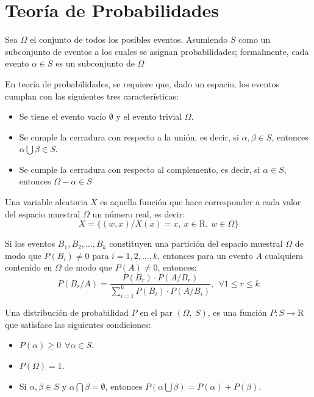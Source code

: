\section{Teoría de Probabilidades}
\label{sec:teoria-probabilidades}
  \begin{defn} Sea $\Omega$ el conjunto de todos los 
  posibles eventos. Asumiendo $S$ como un subconjunto de eventos a los cuales 
  se asignan probabilidades; formalmente, cada evento $\alpha \in S$ es un 
  subconjunto de $\Omega$
  \end{defn}
 En teoría de probabilidades, se requiere que, dado un espacio, los eventos 
 cumplan con las siguientes tres características:
  \begin{itemize}
    \item Se tiene el evento vacío $\emptyset$ y el evento trivial $\Omega$.
    \item Se cumple la cerradura con respecto a la unión, es decir, si 
    $\alpha, \beta \in S$, entonces $\alpha \bigcup \beta \in S$.
    \item Se cumple la cerradura con respecto al complemento, es decir, si 
    $\alpha \in S$, entonces $\Omega - \alpha \in S$
  \end{itemize}
  \begin{defn} Una variable aleatoria $X$ es aquella 
  función que hace corresponder a cada valor del espacio muestral $\Omega$ un 
  número real, es decir: 
  $$X = \lbrace (w, x) / X(x) = x, ~x \in \mathrm{R}, ~w \in \Omega \rbrace$$
	\end{defn}
  \begin{thm} Si los eventos $B_1, B_2, \dots, B_k$ 
  constituyen una partición del espacio muestral $\Omega$ de modo que 
  $P(B_i) \neq 0$ para $i = 1,2,\dots,k$, entonces para un evento $A$ 
  cualquiera contenido en $\Omega$ de modo que $P(A) \neq 0$, entonces: 
  $$P(B_r / A) = \dfrac{P(B_r) \cdot P(A / B_r)}{\displaystyle\sum_{i=1}^{k}{P(B_i) \cdot P(A / B_i)}}, ~~ \forall 1\leq r \leq k$$
  \label{thm:cap-marcoteorico:teorema-bayes}
	\end{thm}
  \begin{defn} Una distribución de probabilidad 
  $P$ en el par $(\Omega,~ S)$, es una función $P : S \rightarrow \mathrm{R}$
  que satisface las siguientes condiciones:
	  \begin{itemize}
	    \item $P(\alpha) \geq 0 ~~ \forall \alpha \in S$.
	    \item $P(\Omega) = 1$.
	    \item Si $\alpha, \beta \in S \text{ y } \alpha \bigcap \beta = \emptyset \text{, entonces } P(\alpha \bigcup \beta) = P(\alpha) + P(\beta)$.
	  \end{itemize}
  \end{defn}
